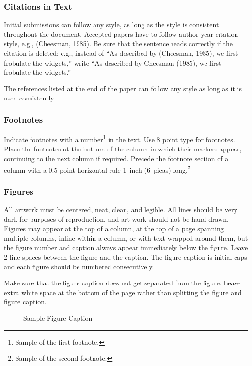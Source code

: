 \documentclass[twoside]{article}
\begin{document}
\subsubsection{Citations in Text}

Initial submissions can follow any style, as long as the style is consistent throughout the document.
Accepted papers have to follow author-year citation style, e.g., (Cheesman, 1985).
Be sure that the sentence reads
correctly if the citation is deleted: e.g., instead of ``As described
by (Cheesman, 1985), we first frobulate the widgets,'' write ``As
described by Cheesman (1985), we first frobulate the widgets.''


The references listed at the end of the paper can follow any style as long as it is used consistently.


\subsubsection{Footnotes}

Indicate footnotes with a number\footnote{Sample of the first
  footnote.} in the text. Use 8 point type for footnotes. Place the
footnotes at the bottom of the column in which their markers appear,
continuing to the next column if required. Precede the footnote
section of a column with a 0.5 point horizontal rule 1~inch (6~picas)
long.\footnote{Sample of the second footnote.}

\subsubsection{Figures}

All artwork must be centered, neat, clean, and legible.  All lines
should be very dark for purposes of reproduction, and art work should
not be hand-drawn.  Figures may appear at the top of a column, at the
top of a page spanning multiple columns, inline within a column, or
with text wrapped around them, but the figure number and caption
always appear immediately below the figure.  Leave 2 line spaces
between the figure and the caption. The figure caption is initial caps
and each figure should be numbered consecutively.

Make sure that the figure caption does not get separated from the
figure. Leave extra white space at the bottom of the page rather than
splitting the figure and figure caption.
\begin{figure}[h]
\vspace{.3in}
\centerline{}
\vspace{.3in}
\caption{Sample Figure Caption}
\end{figure}
\end{document}
